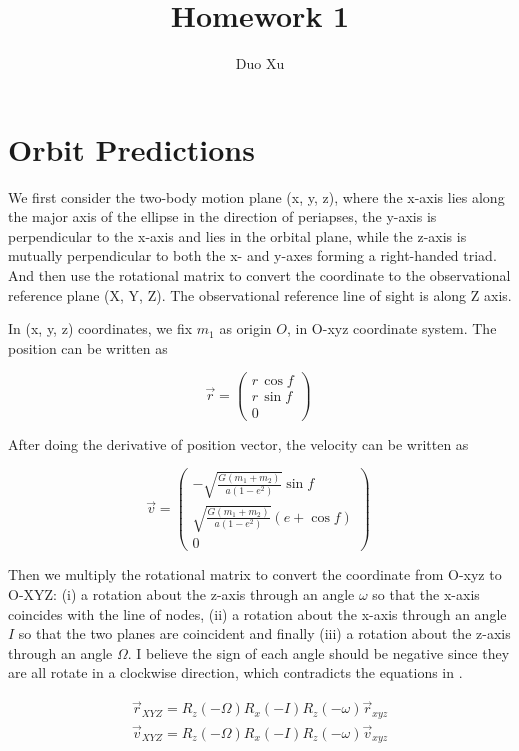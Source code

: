 \documentclass[12pt]{article}
\begin{document}
\title{Homework 1}
\author{Duo Xu}


\section{Orbit Predictions}
\label{Orbit Predictions}

We first consider the two-body motion plane (x, y, z), where the x-axis lies along the major axis of the ellipse in the direction of periapses, the y-axis is perpendicular to the x-axis and lies in the orbital plane, while the z-axis is mutually perpendicular to both the x- and y-axes forming a right-handed triad. And then use the rotational matrix to convert the coordinate to the observational reference plane (X, Y, Z). The observational reference line of sight is along Z axis.


In (x, y, z) coordinates, we fix $m_{1}$ as origin $O$, in O-xyz coordinate system. The position can be written as 

\[  \vec{r} = \left ( \begin{array}{c}
 r\, \cos f  \\
 r\, \sin f \\
0\end{array} \right )\ \]

After doing the derivative of position vector, the velocity can be written as 

\[  \vec{v} = \left ( \begin{array}{c}
 -\sqrt{\frac{G(m_{1}+m_{2})}{a(1-e^{2})}}\sin f  \\
\sqrt{\frac{G(m_{1}+m_{2})}{a(1-e^{2})}} (e+\cos f) \\
0\end{array} \right )\ \]

Then we multiply the rotational matrix to convert the coordinate from O-xyz to O-XYZ:  (i) a rotation about the z-axis through an angle $\omega$ so that the x-axis coincides with the line of nodes, (ii) a rotation about the x-axis through an angle $I$ so that the two planes are coincident and finally (iii) a rotation about the z-axis through an angle $\Omega$. I believe the sign of each angle should be negative since they are all rotate in a clockwise direction, which contradicts the equations in \citet{2010exop.book...15M}. 

\begin{align} 
\vec{r}_{XYZ}=R_{z}(-\Omega)R_{x}(-I)R_{z}(-\omega)\vec{r}_{xyz} \\
\vec{v}_{XYZ}=R_{z}(-\Omega)R_{x}(-I)R_{z}(-\omega)\vec{v}_{xyz}
\end{align}
\end{document}
